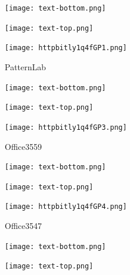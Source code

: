 \documentclass[letterpaper]{article}
\begin{document}
 \centerline{\texttt{[image: text-bottom.png]}} 
 
 \pagebreak 
{} 
 \vspace*{\fill} 
 
  \centerline{\texttt{[image: text-top.png]}} 
 
 \vspace{0.5in} 
 
 \begingroup 
 \centerline{\texttt{[image: httpbitly1q4fGP1.png]}} 
 \endgroup 
 \vspace*{\fill} 

 \hfill{\small PatternLab} 

  \vspace{0.7in} 
 
 \centerline{\texttt{[image: text-bottom.png]}} 
 
 \pagebreak 
{} 
 \vspace*{\fill} 
 
  \centerline{\texttt{[image: text-top.png]}} 
 
 \vspace{0.5in} 
 
 \begingroup 
 \centerline{\texttt{[image: httpbitly1q4fGP3.png]}} 
 \endgroup 
 \vspace*{\fill} 

 \hfill{\small Office3559} 

  \vspace{0.7in} 
 
 \centerline{\texttt{[image: text-bottom.png]}} 
 
 \pagebreak 
{} 
 \vspace*{\fill} 
 
  \centerline{\texttt{[image: text-top.png]}} 
 
 \vspace{0.5in} 
 
 \begingroup 
 \centerline{\texttt{[image: httpbitly1q4fGP4.png]}} 
 \endgroup 
 \vspace*{\fill} 

 \hfill{\small Office3547} 

  \vspace{0.7in} 
 
 \centerline{\texttt{[image: text-bottom.png]}} 
 
 \pagebreak 
{} 
 \vspace*{\fill} 
 
  \centerline{\texttt{[image: text-top.png]}} 
 
 \vspace{0.5in} 
 
\end{document}
